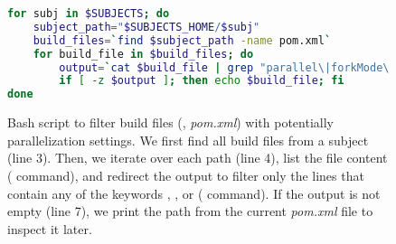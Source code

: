 \begin{figure}[h!]
\centering
\scriptsize
{}
\begin{lstlisting}[language=Bash]
for subj in $SUBJECTS; do
    subject_path="$SUBJECTS_HOME/$subj"
    build_files=`find $subject_path -name pom.xml`
    for build_file in $build_files; do
        output=`cat $build_file | grep "parallel\|forkMode\|forkCount"`
        if [ -z $output ]; then echo $build_file; fi
done
\end{lstlisting}
    \caption{\label{fig:discovery-step} Bash script to filter
    build files (\ie, \emph{pom.xml}) with potentially parallelization
    settings. We first find all build files from a subject (line 3).
    Then, we iterate over each path (line 4), list the file content
    ( command), and redirect the output to filter only the
    lines that contain any of the keywords ,
    , or  ( command).
    If the output is not empty (line 7), we print the path from the
    current \emph{pom.xml} file to inspect it later.}
\end{figure}
